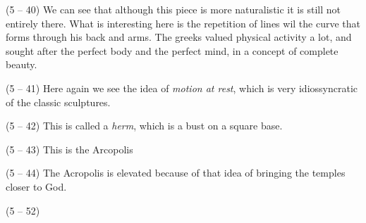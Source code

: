 \documentclass{article}
\begin{document}
\begin{spacing}{1.2}
        (5 -- 40) We can see that although this piece is more naturalistic it is still not entirely there. What is interesting here is the repetition of lines wil the curve that forms through his back and arms. The greeks valued physical activity a lot, and sought after the perfect body and the perfect mind, in a concept of complete beauty.

        (5 -- 41) Here again we see the idea of \emph{motion at rest}, which is very idiossyncratic of the classic sculptures.

        (5 -- 42) This is called a \emph{herm}, which is a bust on a square base.

        (5 -- 43) This is the Arcopolis

        (5 -- 44) The Acropolis is elevated because of that idea of bringing the temples closer to God. 

        (5 -- 52)
    \end{spacing}
\end{document}
